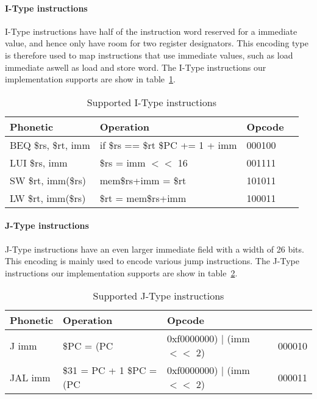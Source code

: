 \paragraph{I-Type instructions}

I-Type instructions have half of the instruction word reserved for a immediate value, and hence only have room for two register designators. This encoding type is therefore used to map instructions that use immediate values, such as load immediate aswell as load and store word. The I-Type instructions our implementation supports are show in table~\ref{table:itype_instructions}.

\begin{table}[h]
    \begin{tabular}{l|l|l|l}

    Phonetic & Operation & Opcode \\
    \hline
    BEQ \$rs, \$rt, imm  & if \$rs == \$rt \$PC += 1 + imm & 000100 \\
    LUI \$rs, imm        & \$rs = imm $<<$ 16                & 001111 \\
    SW \$rt, imm(\$rs)   & mem{\$rs+imm} = \$rt            & 101011 \\
    LW \$rt, imm(\$rs)   & \$rt = mem{\$rs+imm}            & 100011 \\
    \hline
    
    \end{tabular}

    \caption{Supported I-Type instructions}
    \label{table:itype_instructions}
\end{table}

\paragraph{J-Type instructions}

J-Type instructions have an even larger immediate field with a width of 26 bits. This encoding is mainly used to encode various jump instructions. The J-Type instructions our implementation supports are show in table~\ref{table:jtype_instructions}.

\begin{table}[h]
    \begin{tabular}{l|l|l|l}

    Phonetic & Operation & Opcode \\
    \hline
    J imm  & \$PC = (PC & 0xf0000000) | (imm $<<$ 2) & 000010 \\
    JAL imm  & \$31 = PC + 1 \$PC = (PC & 0xf0000000) | (imm $<<$ 2) & 000011 \\
    \hline
    
    \end{tabular}

    \caption{Supported J-Type instructions}
    \label{table:jtype_instructions}
\end{table}
